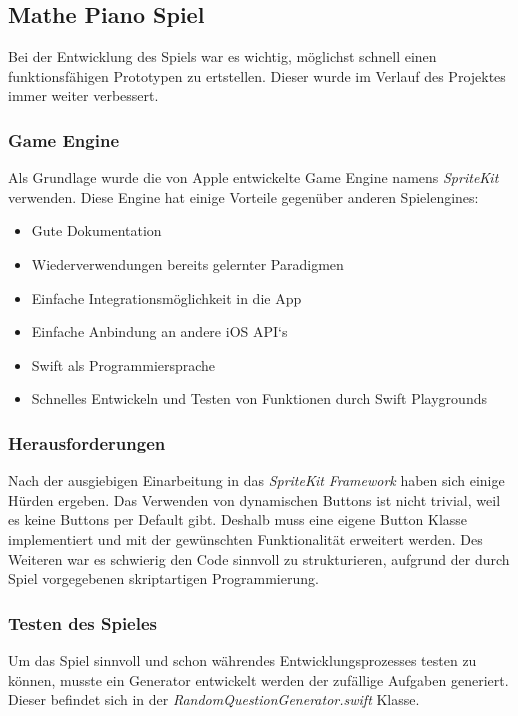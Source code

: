 \subsection{Mathe Piano Spiel}
Bei der Entwicklung des Spiels war es wichtig, möglichst schnell einen funktionsfähigen Prototypen zu ertstellen. Dieser wurde im Verlauf des Projektes immer weiter verbessert.


\subsubsection{Game Engine}
Als Grundlage wurde die von Apple entwickelte Game Engine namens \textit{SpriteKit} verwenden. Diese Engine hat einige Vorteile gegenüber anderen Spielengines:
\begin{itemize}
\item Gute Dokumentation
\item Wiederverwendungen bereits gelernter Paradigmen    
\item Einfache Integrationsmöglichkeit in die App
\item Einfache Anbindung an andere iOS API‘s
\item Swift als Programmiersprache 
\item Schnelles Entwickeln und Testen von Funktionen durch Swift Playgrounds
\end{itemize}

\subsubsection{Herausforderungen}
Nach der ausgiebigen Einarbeitung in das \textit{SpriteKit} \textit{Framework} haben sich einige Hürden ergeben. Das Verwenden von dynamischen Buttons ist nicht trivial, weil es keine Buttons per Default gibt. Deshalb muss eine eigene Button Klasse implementiert und mit der gewünschten Funktionalität erweitert werden. Des Weiteren war es schwierig den Code sinnvoll zu strukturieren, aufgrund der durch Spiel vorgegebenen skriptartigen Programmierung. %
\subsubsection{Testen des Spieles}
Um das Spiel sinnvoll und schon währendes Entwicklungsprozesses testen zu können, musste ein Generator entwickelt werden der zufällige Aufgaben generiert. Dieser befindet sich in der \textit{RandomQuestionGenerator.swift} Klasse. 
